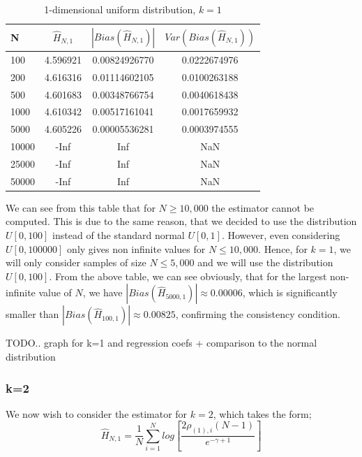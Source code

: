 \documentclass{article}
\begin{document}
\begin{table}
\caption{1-dimensional uniform distribution, $k=1$} \label{uniform_k=1_table}
\begin{center}
\begin{tabular}{| l | c c c|} 
\toprule
N & $\hat{H}_{N, 1}$ & $|Bias(\hat{H}_{N, 1})|$ & $Var(Bias(\hat{H}_{N, 1}))$ \\
\midrule[1pt]
100     & 4.596921     & 0.00824926770     & 0.0222674976  \\
200     & 4.616316     & 0.01114602105     & 0.0100263188  \\
500     & 4.601683     & 0.00348766754     & 0.0040618438  \\
1000    & 4.610342     & 0.00517161041     & 0.0017659932  \\
5000    & 4.605226     & 0.00005536281     & 0.0003974555  \\
10000   &     -Inf     &           Inf     &          NaN  \\
25000   &     -Inf     &           Inf     &          NaN  \\
50000   &     -Inf     &           Inf     &          NaN  \\
\hline
\end{tabular}
\end{center}
\end{table}

We can see from this table that for $N \geq 10,000$ the estimator cannot be computed. This is due to the same reason, that we decided to use the distribution $U[0,100]$ instead of the standard normal $U[0,1]$. However, even considering $U[0,100000]$ only gives non infinite values for $N \leq 10,000$. Hence, for $k=1$, we will only consider samples of size $N \leq 5,000$ and we will use the distribution $U[0,100]$. From the above table, we can see obviously, that for the largest non-infinite value of $N$, we have $|Bias(\hat{H}_{5000, 1})| \approx 0.00006$, which is significantly smaller than $|Bias(\hat{H}_{100, 1})| \approx 0.00825$, confirming the consistency condition.

TODO.. graph for k=1 and regression coefs + comparison to the normal distribution




\subsubsection{k=2} \label{U_k=2}
We now wish to consider the estimator for $k=2$, which takes the form;
\begin{equation} 
\hat{H}_{N, 1} = \frac{1}{N} \sum_{i=1}^{N} log \left[ \frac{2\rho_{(1),i} (N-1)}{e^{-\gamma + 1}} \right] \nonumber
\end{equation}
\end{document}
